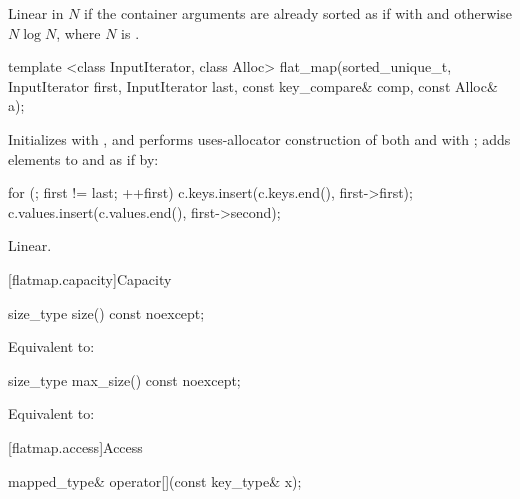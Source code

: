 \begin{codeblock}
\begin{codeblock}
\begin{codeblock}
\begin{addedblock}
\begin{itemdescr}
\pnum
\complexity
Linear in $N$ if the container arguments are already sorted as if with
 and otherwise $N \log N$, where $N$ is
.
\end{itemdescr}

%
\begin{itemdecl}
template <class InputIterator, class Alloc>
  flat_map(sorted_unique_t, InputIterator first, InputIterator last,
           const key_compare& comp, const Alloc& a);
\end{itemdecl}

\begin{itemdescr}
\pnum
\effects Initializes  with , and performs
uses-allocator construction of both
 and  with ; adds elements to
 and  as if by:
\begin{codeblock}
for (; first != last; ++first) {
  c.keys.insert(c.keys.end(), first->first);
  c.values.insert(c.values.end(), first->second);
}
\end{codeblock}

\pnum
\complexity
Linear.
\end{itemdescr}

[flatmap.capacity]{Capacity}

%
\begin{itemdecl}
size_type size() const noexcept;
\end{itemdecl}

\begin{itemdescr}
\pnum
\effects
Equivalent to: 
\end{itemdescr}

%
\begin{itemdecl}
size_type max_size() const noexcept;
\end{itemdecl}

\begin{itemdescr}
\pnum
\effects
Equivalent to: 
\end{itemdescr}

[flatmap.access]{Access}

%
\begin{itemdecl}
mapped_type& operator[](const key_type& x);
\end{itemdecl}


\end{addedblock}
\end{codeblock}
\end{codeblock}
\end{codeblock}
